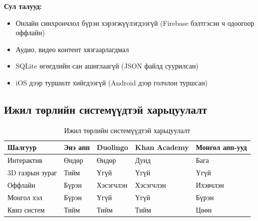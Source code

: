 \textbf{Сул талууд:}
\begin{itemize}
	\item Онлайн синхрончлол бүрэн хэрэгжүүлэгдээгүй (Firebase бэлтгэсэн ч одоогоор оффлайн)
	\item Аудио, видео контент хязгаарлагдмал
	\item SQLite өгөгдлийн сан ашиглаагүй (JSON файлд суурилсан)
	\item iOS дээр туршилт хийгдээгүй (Android дээр голчлон туршсан)
\end{itemize}

\subsection{Ижил төрлийн системүүдтэй харьцуулалт}

\begin{table}[htbp]
\centering
\begin{tabular}{|p{3cm}|p{2.5cm}|p{2.5cm}|p{2.5cm}|p{2.5cm}|}
\hline
\textbf{Шалгуур} & \textbf{Энэ апп} & \textbf{Duolingo} & \textbf{Khan Academy} & \textbf{Монгол апп-ууд} \\
\hline
Интерактив & Өндөр & Өндөр & Дунд & Бага \\
\hline
3D газрын зураг & Тийм & Үгүй & Үгүй & Үгүй \\
\hline
Оффлайн & Бүрэн & Хэсэгчлэн & Хэсэгчлэн & Ихэвчлэн \\
\hline
Монгол хэл & Бүрэн & Үгүй & Үгүй & Бүрэн \\
\hline
Квиз систем & Тийм & Тийм & Тийм & Цөөн \\
\hline
\end{tabular}
\caption{Ижил төрлийн системүүдтэй харьцуулалт}
\label{tab:comparison}
\end{table}
